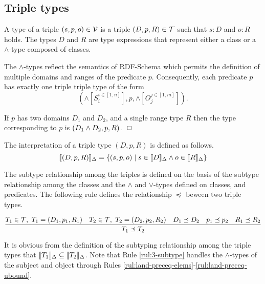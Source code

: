 \documentclass[runningheads]{llncs}
\newcommand{\llb}{\llbracket}
\newcommand{\rrb}{\rrbracket}
\newcommand{\V}{{\cal V}}
\newcommand{\T}{{\cal T}}
\newcommand{\finbox}{\phantom{.}\hfill\Box}
\begin{document}






\subsection{Triple types\label{sec:3-types}}

A type of a triple $(s,p,o)\in\V$ is a triple $(D,p,R)\in\T$ such that
$s:D$ and $o:R$ holds. The types $D$ and $R$ are type expressions that
represent either a class or a $\land$-type composed of classes.

The $\land$-types reflect the semantics of RDF-Schema \cite{rdfschema}
which permits the definition of multiple domains and ranges of the
predicate $p$. Consequently, each predicate $p$ has exactly one triple
triple type of the form
$$(\land[S_i^{i\in[1,n]}],p,\land[O_j^{j\in[1,m]}]).$$

\begin{example}
  If $p$ has two domains $D_1$ and $D_2$, and a single
range type $R$ then the type corresponding to $p$ is
$(D_1\land\/D_2,p,R)$. $\finbox$
\end{example}

\noindent
The interpretation of a triple type $(D,p,R)$ is defined as
follows.
$$\llb(D,p,R)\rrb_\Delta=\{(s,p,o)\mid\/s\in\llb\/D\rrb_\Delta\land\/o\in\llb\/R\rrb_\Delta \}$$

The subtype relationship among the triples is defined on the basis of
the subtype relationship among the classes and the $\land$ and
$\lor$-types defined on classes, and predicates. The following rule
defines the relationship $\preceq$ beween two triple types.

\begin{equation}
\label{rul:3-subtype}
\dfrac{T_1\in\T,\ T_1=(D_1,p_1,R_1)\quad T_2\in\T,\ T_2=(D_2,p_2,R_2)\quad\/D_1\preceq\/D_2\quad\/p_1\preceq\/p_2\quad\/R_1\preceq\/R_2}
      {T_1\preceq\/T_2}
\end{equation}

It is obvious from the definition of the subtyping relationship among
the triple types that
$\llb\/T_1\rrb_\Delta\subseteq\llb\/T_2\rrb_\Delta$. Note that Rule
\ref{rul:3-subtype} handles the $\land$-types of the subject and
object through Rules
\ref{rul:land-preceq-elems}-\ref{rul:land-preceq-ubound}.
\end{document}

